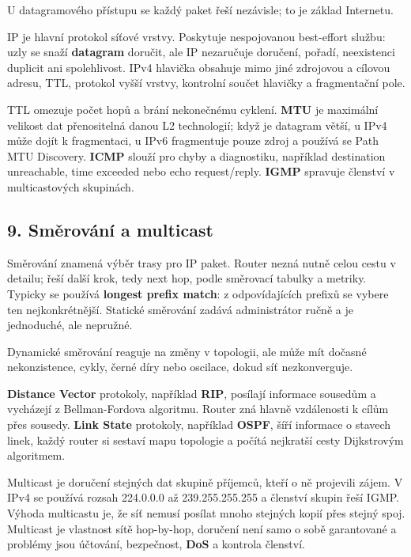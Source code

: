 U datagramového přístupu se každý paket řeší nezávisle; to je základ Internetu.

IP je hlavní protokol síťové vrstvy. Poskytuje nespojovanou best-effort službu: uzly se snaží \textbf{datagram} doručit, ale IP nezaručuje doručení, pořadí, neexistenci duplicit ani spolehlivost. IPv4 hlavička obsahuje mimo jiné zdrojovou a cílovou adresu, TTL, protokol vyšší vrstvy, kontrolní součet hlavičky a fragmentační pole.

TTL omezuje počet hopů a brání nekonečnému cyklení. \textbf{MTU} je maximální velikost dat přenositelná danou L2 technologií; když je datagram větší, u IPv4 může dojít k fragmentaci, u IPv6 fragmentuje pouze zdroj a používá se Path MTU Discovery. \textbf{ICMP} slouží pro chyby a diagnostiku, například destination unreachable, time exceeded nebo echo request/reply. \textbf{IGMP} spravuje členství v multicastových skupinách.

\subsection*{9. Směrování a multicast}

Směrování znamená výběr trasy pro IP paket. Router nezná nutně celou cestu v detailu; řeší další krok, tedy next hop, podle směrovací tabulky a metriky. Typicky se používá \textbf{longest prefix match}: z odpovídajících prefixů se vybere ten nejkonkrétnější. Statické směrování zadává administrátor ručně a je jednoduché, ale nepružné.

Dynamické směrování reaguje na změny v topologii, ale může mít dočasné nekonzistence, cykly, černé díry nebo oscilace, dokud síť nezkonverguje.

\textbf{Distance Vector} protokoly, například \textbf{RIP}, posílají informace sousedům a vycházejí z Bellman-Fordova algoritmu. Router zná hlavně vzdálenosti k cílům přes sousedy. \textbf{Link State} protokoly, například \textbf{OSPF}, šíří informace o stavech linek, každý router si sestaví mapu topologie a počítá nejkratší cesty Dijkstrovým algoritmem.

Multicast je doručení stejných dat skupině příjemců, kteří o ně projevili zájem. V IPv4 se používá rozsah 224.0.0.0 až 239.255.255.255 a členství skupin řeší IGMP. Výhoda multicastu je, že síť nemusí posílat mnoho stejných kopií přes stejný spoj. Multicast je vlastnost sítě hop-by-hop, doručení není samo o sobě garantované a problémy jsou účtování, bezpečnost, \textbf{DoS} a kontrola členství.

